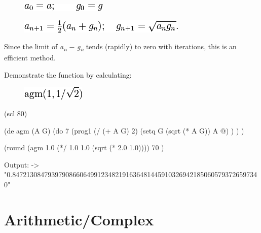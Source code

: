 \begin{figure}[H]
\centering
\includegraphics[scale=.6]{graphics/da869c8260ae3107ca34619fd2642642.png}
\end{figure}

\begin{figure}[H]
\centering
\includegraphics[scale=.6]{graphics/7416c556a1ecfe80d64f32dbc9c18ae6.png}
\end{figure}

Since the limit of \emph{a}\textsubscript{\emph{n}} −
\emph{g}\textsubscript{\emph{n}} tends (rapidly) to zero with
iterations, this is an efficient method.

Demonstrate the function by calculating:

\begin{figure}[H]
\centering
\includegraphics[scale=.6]{graphics/953f4c8f564b5ed18e1b31d2716b5f8c.png}
\end{figure}



\begin{wideverbatim}

(scl 80)

(de agm (A G)
   (do 7
      (prog1 (/ (+ A G) 2)
         (setq G (sqrt (* A G))  A @) ) ) )

(round
   (agm 1.0 (*/ 1.0 1.0 (sqrt (* 2.0 1.0))))
   70 )

Output:
-> "0.8472130847939790866064991234821916364814459103269421850605793726597340"

\end{wideverbatim}

\pagebreak{}
\section*{Arithmetic/Complex}

